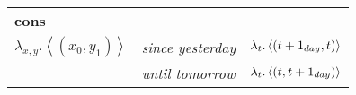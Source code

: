 \documentclass{article}
\begin{document}
\begin{center}
\begin{tabular}{l l l}
	\multicolumn{3}{l}{{\bf cons}} \\
	$\lambda_{x,y}.\left< (x_0, y_1) \right>$
		& {\em since yesterday} 
			& $\lambda_t.\left< (t+1_{day},t) \right>$ \\
		& {\em until tomorrow} 
			& $\lambda_t.\left< (t,t+1_{day}) \right>$ \\
\end{tabular}
\end{center}
\end{document}
